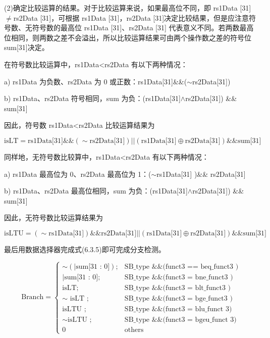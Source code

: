 \documentclass[12pt,a4paper]{article}
\begin{document}
(2)确定比较运算的结果。对于比较运算来说，如果最高位不同，即 rs1Data [31]$\neq$rs2Data [31]，可根据 rs1Data [31]，rs2Data [31]决定比较结果，但是应注意符号数、无符号数的最高位 rs1Data [31]、rs2Data [31] 代表意义不同。若两数最高位相同，则两数之差不会溢出，所以比较运算结果可由两个操作数之差的符号位 sum[31]决定。

在符号数比较运算中，rs1Data<rs2Data 有以下两种情况：

a) rs1Data 为负数、rs2Data 为 0 或正数：rs1Data[31]\&\&($\sim$rs2Data[31])

b) rs1Data、rs2Data 符号相同，sum 为负：(rs1Data[31]$\wedge$rs2Data[31]) \&\& sum[31]

因此，符号数 rs1Data<rs2Data 比较运算结果为

\begin{equation}
\text{isLT} = \text{rs1Data[31]} \texttt{\&\&} (\sim \text{rs2Data[31]}) \texttt{||} (\text{rs1Data[31]} \oplus \text{rs2Data[31]}) \texttt{\&\&} \text{sum[31]}
\tag{6.3.3}
\end{equation}

同样地，无符号数比较算中，rs1Data<rs2Data 有以下两种情况：

a) rs1Data 最高位为 0、rs2Data 最高位为 1：($\sim$rs1Data[31] )\&\& rs2Data[31]

b) rs1Data、rs2Data 最高位相同，sum 为负：(rs1Data[31]$\wedge$rs2Data[31]) \&\& sum[31]

因此，无符号数比较运算结果为

\begin{equation}
\text{isLTU} = (\sim \text{rs1Data[31]}) \texttt{\&\&} \text{rs2Data[31]} \texttt{||} (\text{rs1Data[31]} \oplus \text{rs2Data[31]}) \texttt{\&\&} \text{sum[31]}
\tag{6.3.4}
\end{equation}

最后用数据选择器完成式(6.3.5)即可完成分支检测。

\begin{equation}
\text{Branch} = \begin{cases}
\sim (| \text{sum[31 : 0]}); & \text{SB\_type  \& \& (funct3 == beq\_funct3 )} \\
| \text{sum[31 : 0]}; & \text{SB\_type  \& \& (funct3 = bne\_funct3 )} \\
\text{isLT;} & \text{SB\_type  \& \&(funct3 = blt\_funct3 )} \\
\sim \text{ isLT ;} & \text{SB\_type  \& \& (funct3 = bge\_funct3 )} \\
\text{isLTU ;} & \text{SB\_type \& \& (funct3 = blu\_funct 3)} \\
\sim \text{isLTU ;} & \text{SB\_type  \& \& (funct3 = bgeu\_funct 3)} \\
0 & \text{others}
\end{cases}
\tag{6.3.5}
\end{equation}
\end{document}
